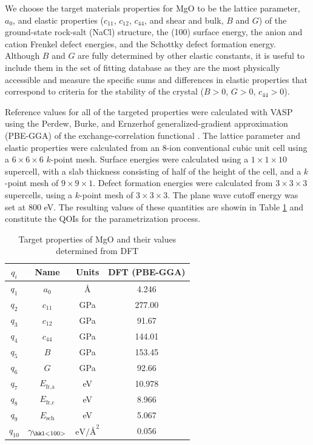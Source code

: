 We choose the target materials properties for MgO to be the lattice parameter, $a_0$, and elastic properties ($c_{11}$, $c_{12}$, $c_{44}$, and shear and bulk, $B$ and $G$) of the ground-state rock-salt (NaCl) structure, the \hkl(100) surface energy, the anion and cation Frenkel defect energies, and the Schottky defect formation energy.  Although $B$ and $G$ are fully determined by other elastic constants, it is useful to include them in the set of fitting database as they are the most physically accessible and measure the specific sums and differences in elastic properties that correspond to criteria for the stability of the crystal ($B > 0$, $G > 0$, $c_{44}> 0$).

Reference values for all of the targeted properties were calculated with VASP\cite{kresse1993_vasp,kresse1996_vasp1,kresse1996_vasp2} using the Perdew, Burke, and Ernzerhof generalized-gradient approximation (PBE-GGA) of the exchange-correlation functional \cite{perdew1996_gga_pbe}.
The lattice parameter and elastic properties were calculated from an 8-ion conventional cubic unit cell using a $6 \times 6 \times 6$ $k$-point mesh.  Surface energies were calculated using a $1 \times 1 \times 10$ supercell, with a slab thickness consisting of half of the height of the cell, and a $k$-point mesh of $9 \times 9 \times 1$.  Defect formation energies were calculated from $3 \times 3 \times 3$ supercells, using a $k$-point mesh of $3 \times 3 \times 3$.  The plane wave cutoff energy was set at $800$ eV. The resulting values of these quantities are showin in Table \ref{tbl:MgO_target} and constitute the QOIs for the parametrization process.

\begin{table}[ht]
	\caption[Target Properties of MgO]{Target properties of MgO and their values determined from DFT}
	\label{tbl:MgO_target}
	\centering
	\begin{tabular}{cccc}
		\hline
		 $q_i$ & Name & Units & {DFT (PBE-GGA)} \\
		\hline
    $q_1$ & $a_0$     & \AA   &	4.246 \\
    $q_2$ & $c_{11}$  & GPa   & 277.00 \\
    $q_3$ & $c_{12}$  & GPa   & 91.67 \\
    $q_4$ & $c_{44}$  & GPa 	& 144.01 \\
		$q_5$ & $B$       & GPa   & 153.45 \\
    $q_6$ & $G$       & GPa   & 92.66 \\
		$q_7$ & $E_{\text{fr,a}}$ & eV & 	10.978 \\
		$q_8$ & $E_{\text{fr,c}}$ & eV & 8.966 \\
		$q_9$ & $E_{\text{sch}}$ & eV &	5.067 \\
		$q_{10}$ & $\gamma_{\text{\hkl<100>}}$ & $\text{eV/\AA}^2$ &	0.056 \\
		\hline
	\end{tabular}
\end{table}

